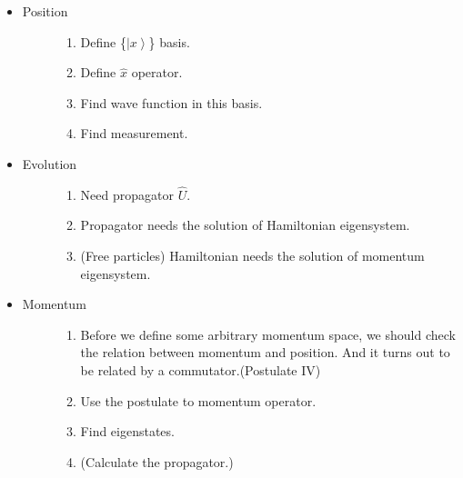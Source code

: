 \documentclass[letterpaper,10pt,english]{sphinxmanual}
\newcommand{\ket}[1]{\left| #1\right\rangle}
\begin{document}
\begin{itemize}
\item {} \begin{description}
\item[{Position}] \leavevmode\begin{enumerate}
\item {} 
Define \{$\ket{x}$\} basis.

\item {} 
Define $\hat x$ operator.

\item {} 
Find wave function in this basis.

\item {} 
Find measurement.

\end{enumerate}

\end{description}

\item {} \begin{description}
\item[{Evolution}] \leavevmode\begin{enumerate}
\item {} 
Need propagator $\hat U$.

\item {} 
Propagator needs the solution of Hamiltonian eigensystem.

\item {} 
(Free particles) Hamiltonian needs the solution of momentum eigensystem.

\end{enumerate}

\end{description}

\item {} \begin{description}
\item[{Momentum}] \leavevmode\begin{enumerate}
\item {} 
Before we define some arbitrary momentum space, we should check the relation between momentum and position. And it turns out to be related by a commutator.(Postulate IV)

\item {} 
Use the postulate to momentum operator.

\item {} 
Find eigenstates.

\item {} 
(Calculate the propagator.)

\end{enumerate}

\end{description}

\end{itemize}
\end{document}
